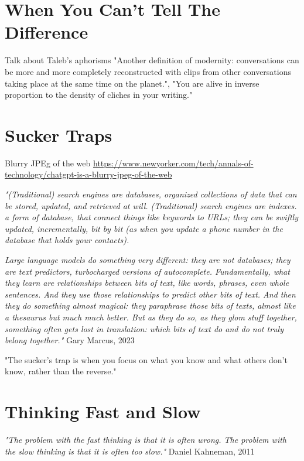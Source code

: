 \section{When You Can't Tell The Difference}

Talk about Taleb's aphorisms "Another definition of modernity: conversations can be more and more completely reconstructed with clips from other conversations taking place at the same time on the planet.", "You are alive in inverse proportion to the density of cliches in your writing."

\section{Sucker Traps}

Blurry JPEg of the web \url{https://www.newyorker.com/tech/annals-of-technology/chatgpt-is-a-blurry-jpeg-of-the-web}

\textit{"(Traditional) search engines are databases, organized collections of data that can be stored, updated, and retrieved at will. (Traditional) search engines are indexes. a form of database, that connect things like keywords to URLs; they can be swiftly updated, incrementally, bit by bit (as when you update a phone number in the database that holds your contacts).}

\textit{Large language models do something very different: they are not databases; they are text predictors, turbocharged versions of autocomplete. Fundamentally, what they learn are relationships between bits of text, like words, phrases, even whole sentences. And they use those relationships to predict other bits of text. And then they do something almost magical: they paraphrase those bits of texts, almost like a thesaurus but much much better. But as they do so, as they glom stuff together, something often gets lost in translation: which bits of text do and do not truly belong together."} Gary Marcus, 2023 \cite{marcus2023}

"The sucker's trap is when you focus on what you know and what others don't know, rather than the reverse."

\section{Thinking Fast and Slow}

\textit{"The problem with the fast thinking is that it is often wrong. The problem with the slow thinking is that it is often too slow."} Daniel Kahneman, 2011 \cite{Kahneman2011}

